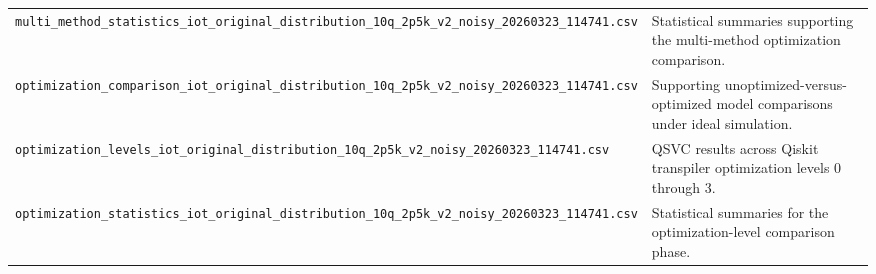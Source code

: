 \documentclass{ieeeaccess}
\begin{document}
\begin{table}[t]
{\begin{tabular}{|l|p{}|}
\texttt{multi\_method\_statistics\_iot\_original\_distribution\_10q\_2p5k\_v2\_noisy\_20260323\_114741.csv} & Statistical summaries supporting the multi-method optimization comparison. \\
\texttt{optimization\_comparison\_iot\_original\_distribution\_10q\_2p5k\_v2\_noisy\_20260323\_114741.csv} & Supporting unoptimized-versus-optimized model comparisons under ideal simulation. \\
\texttt{optimization\_levels\_iot\_original\_distribution\_10q\_2p5k\_v2\_noisy\_20260323\_114741.csv} & QSVC results across Qiskit transpiler optimization levels 0 through 3. \\
\texttt{optimization\_statistics\_iot\_original\_distribution\_10q\_2p5k\_v2\_noisy\_20260323\_114741.csv} & Statistical summaries for the optimization-level comparison phase. \\
\hline
\end{tabular}%
}
\end{table}
\end{document}
